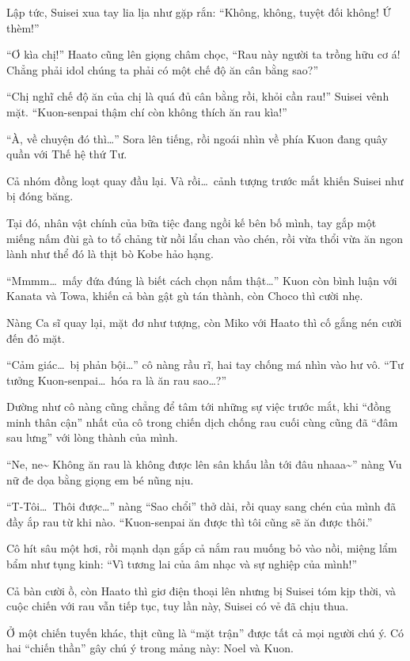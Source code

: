 \documentclass[../main.tex]{subfiles}
\begin{document}
Lập tức, Suisei xua tay lia lịa như gặp rắn: ``Không, không, tuyệt đối không! Ứ thèm!''

``Ơ kìa chị!'' Haato cũng lên giọng châm chọc, ``Rau này người ta trồng hữu cơ á! Chẳng phải idol chúng ta phải có một chế độ ăn cân bằng sao?''

``Chị nghĩ chế độ ăn của chị là quá đủ cân bằng rồi, khỏi cần rau!'' Suisei vênh mặt. ``Kuon-senpai thậm chí còn không thích ăn rau kìa!''

``À, về chuyện đó thì\dots'' Sora lên tiếng, rồi ngoái nhìn về phía Kuon đang quây quần với Thế hệ thứ Tư.

Cả nhóm đồng loạt quay đầu lại. Và rồi\dots\ cảnh tượng trước mắt khiến Suisei như bị đóng băng.

Tại đó, nhân vật chính của bữa tiệc đang ngồi kế bên bố mình, tay gắp một miếng nấm đùi gà to tổ chảng từ nồi lẩu chan vào chén, rồi vừa thổi vừa ăn ngon lành như thể đó là thịt bò Kobe hảo hạng.

``Mmmm\dots\ mấy đứa đúng là biết cách chọn nấm thật\dots'' Kuon còn bình luận với Kanata và Towa, khiến cả bàn gật gù tán thành, còn Choco thì cười nhẹ.

Nàng Ca sĩ quay lại, mặt đơ như tượng, còn Miko với Haato thì cố gắng nén cười đến đỏ mặt.

``Cảm giác\dots\ bị phản bội\dots'' cô nàng rầu rĩ, hai tay chống má nhìn vào hư vô. ``Tư tưởng Kuon-senpai\dots\ hóa ra là ăn rau sao\dots?''

Dường như cô nàng cũng chẳng để tâm tới những sự việc trước mắt, khi ``đồng minh thân cận'' nhất của cô trong chiến dịch chống rau cuối cùng cũng đã ``đâm sau lưng'' với lòng thành của mình.

``Ne, ne\~{} Không ăn rau là không được lên sân khấu lần tới đâu nhaaa\~{}'' nàng Vu nữ đe dọa bằng giọng em bé nũng nịu.

``T-Tôi\dots\ Thôi được\dots'' nàng ``Sao chổi'' thở dài, rồi quay sang chén của mình đã đầy ắp rau từ khi nào. ``Kuon-senpai ăn được thì tôi cũng sẽ ăn được thôi.''

Cô hít sâu một hơi, rồi mạnh dạn gắp cả nắm rau muống bỏ vào nồi, miệng lẩm bẩm như tụng kinh: ``Vì tương lai của âm nhạc và sự nghiệp của mình!''

Cả bàn cười ồ, còn Haato thì giơ điện thoại lên nhưng bị Suisei tóm kịp thời, và cuộc chiến với rau vẫn tiếp tục, tuy lần này, Suisei có vẻ đã chịu thua.

Ở một chiến tuyến khác, thịt cũng là ``mặt trận'' được tất cả mọi người chú ý. Có hai ``chiến thần'' gây chú ý trong mảng này: Noel và Kuon.
\end{document}
